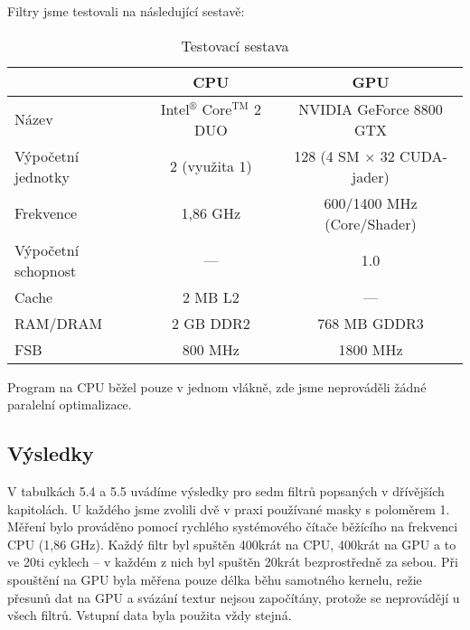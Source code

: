     Filtry jsme testovali na následující sestavě:

    \begin{table}[h]
    \begin{center}
    \begin{tabular}{lcc}
      \toprule
      & CPU & GPU \\
      \midrule
      Název & Intel$^\circledR$ Core$^\mathrm{TM}$ 2 DUO & NVIDIA GeForce 8800 GTX \\
      Výpočetní jednotky & 2 (využita 1) & 128 (4 SM $\times$ 32 CUDA-jader) \\
      Frekvence & 1,86 GHz & 600/1400 MHz (Core/Shader)\\
      Výpočetní schopnost & --- & 1.0 \\
      Cache & 2 MB L2 & --- \\
      RAM/DRAM & 2 GB DDR2 & 768 MB GDDR3 \\
      FSB & 800 MHz & 1800 MHz \\
      \bottomrule
    \end{tabular}
    \caption{Testovací sestava}
    \end{center}
\end{table}

    Program na CPU běžel pouze v jednom vlákně, zde jsme neprováděli žádné paralelní optimalizace.

    \subsection{Výsledky}

    V tabulkách 5.4 a 5.5 uvádíme výsledky pro sedm filtrů popsaných v dřívějších kapitolách. U každého jsme zvolili dvě v praxi používané masky s poloměrem 1. Měření bylo prováděno pomocí rychlého systémového čítače běžícího na frekvenci CPU (1,86 GHz). Každý filtr byl spuštěn 400krát na CPU, 400krát na GPU a to ve 20ti cyklech -- v každém z nich byl spuštěn 20krát bezprostředně za sebou. Při spouštění na GPU byla měřena pouze délka běhu samotného kernelu, režie přesunů dat na GPU a svázání textur nejsou započítány, protože se neprovádějí u všech filtrů. Vstupní data byla použita vždy stejná.

